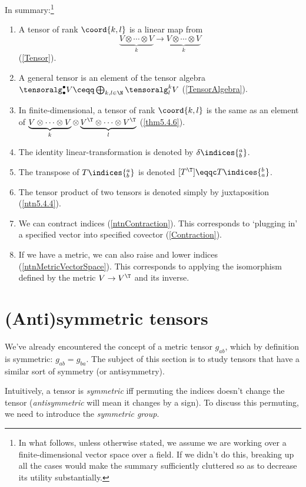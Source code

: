 In summary:\footnote{In what follows, unless otherwise stated, we assume we are working over a finite-dimensional vector space over a field.  If we didn't do this, breaking up all the cases would make the summary sufficiently cluttered so as to decrease its utility substantially.}
\begin{enumerate}
	\item A tensor of rank $\coord{k,l}$ is a linear map from
	\begin{equation}
		\underbrace{V\otimes \cdots \otimes V}_k\rightarrow \underbrace{V\otimes \cdots \otimes V}_k
	\end{equation}
	(\cref{Tensor}).
	\item A general tensor is an element of the tensor algebra $\tensoralg _{\bullet}^{\bullet}V\ceqq \bigoplus _{k,l\in \N}\tensoralg _l^kV$ (\cref{TensorAlgebra}).
	\item In finite-dimensional, a tensor of rank $\coord{k,l}$ is the same as an element of $\underbrace{V\otimes \cdots \otimes V}_k\otimes \underbrace{V^{\T}\otimes \cdots \otimes V^{\T}}_l$ (\cref{thm5.4.6}).
	\item The identity linear-transformation is denoted by $\delta \indices{^a_b}$.
	\item The transpose of $T\indices{^a_b}$ is denoted $[T^{\T}]\eqqc T\indices{_a^b}$.
	\item The tensor product of two tensors is denoted simply by juxtaposition (\cref{ntn5.4.4}).
	\item We can contract indices (\cref{ntnContraction}).  This corresponds to `plugging in' a specified vector into  specified covector (\cref{Contraction}).
	\item If we have a metric, we can also raise and lower indices (\cref{ntnMetricVectorSpace}).  This corresponds to applying the isomorphism defined by the metric $V\rightarrow V^{\T}$ and its inverse.
\end{enumerate}

\section{(Anti)symmetric tensors}

We've already encountered the concept of a metric tensor $g_{ab}$, which by definition is symmetric:  $g_{ab}=g_{ba}$.  The subject of this section is to study tensors that have a similar sort of symmetry (or antisymmetry).

Intuitively, a tensor is \emph{symmetric} iff permuting the indices doesn't change the tensor (\emph{antisymmetric} will mean it changes by a sign).  To discuss this permuting, we need to introduce the \emph{symmetric group}.

